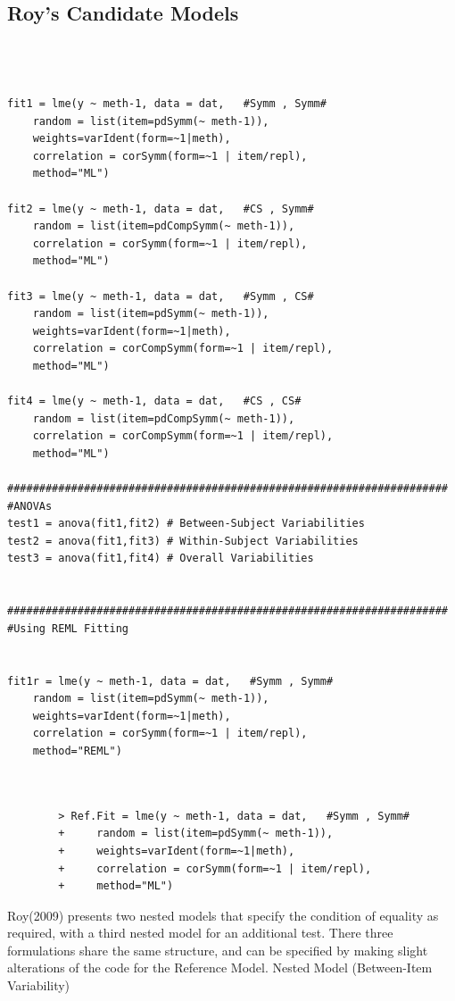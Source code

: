\documentclass[12pt, a4paper]{report}
\theoremstyle{plain}
\theoremstyle{definition}
\theoremstyle{remark}
\begin{document}
\subsection{Roy's Candidate Models}
	
\begin{framed}	
\begin{verbatim}


    
fit1 = lme(y ~ meth-1, data = dat,   #Symm , Symm#
    random = list(item=pdSymm(~ meth-1)), 
    weights=varIdent(form=~1|meth),
    correlation = corSymm(form=~1 | item/repl), 
    method="ML")
    
fit2 = lme(y ~ meth-1, data = dat,   #CS , Symm#
    random = list(item=pdCompSymm(~ meth-1)),
    correlation = corSymm(form=~1 | item/repl), 
    method="ML")
    
fit3 = lme(y ~ meth-1, data = dat,   #Symm , CS# 
    random = list(item=pdSymm(~ meth-1)),
    weights=varIdent(form=~1|meth), 
    correlation = corCompSymm(form=~1 | item/repl), 
    method="ML")
    
fit4 = lme(y ~ meth-1, data = dat,   #CS , CS# 
    random = list(item=pdCompSymm(~ meth-1)), 
    correlation = corCompSymm(form=~1 | item/repl), 
    method="ML")
    
#####################################################################
#ANOVAs
test1 = anova(fit1,fit2) # Between-Subject Variabilities
test2 = anova(fit1,fit3) # Within-Subject Variabilities
test3 = anova(fit1,fit4) # Overall Variabilities


#####################################################################
#Using REML Fitting


fit1r = lme(y ~ meth-1, data = dat,   #Symm , Symm#
    random = list(item=pdSymm(~ meth-1)), 
    weights=varIdent(form=~1|meth),
    correlation = corSymm(form=~1 | item/repl), 
    method="REML")
    
\end{verbatim}
\end{framed}

	\begin{framed}	\begin{verbatim}
		
		> Ref.Fit = lme(y ~ meth-1, data = dat,   #Symm , Symm#
		+     random = list(item=pdSymm(~ meth-1)), 
		+     weights=varIdent(form=~1|meth),
		+     correlation = corSymm(form=~1 | item/repl), 
		+     method="ML")
\end{verbatim}
\end{framed}
		Roy(2009) presents two nested models that specify the condition of equality as required, with a third nested model for an additional test. There three formulations share the same structure, and can be specified by making slight alterations of the code for the Reference Model.
		Nested Model (Between-Item Variability)
\end{document}
